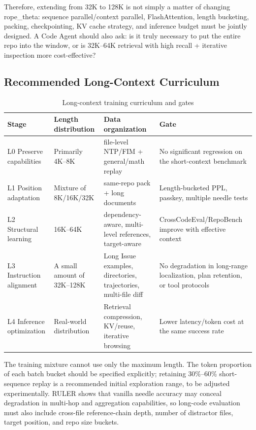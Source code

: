 \documentclass[10pt,a4paper,UTF8,fontset=none]{ctexart}
\newcommand{\ident}[1]{{\rmfamily #1}}
\begin{document}
Therefore, extending from 32K to 128K is not simply a matter of changing \ident{rope\_theta}: sequence parallel/context parallel, FlashAttention, length bucketing, packing, checkpointing, KV cache strategy, and inference budget must be jointly designed. A Code Agent should also ask: is it truly necessary to put the entire repo into the window, or is 32K--64K retrieval with high recall + iterative inspection more cost-effective?

\subsection{Recommended Long-Context Curriculum}

\begin{table}[htbp]
\centering
\caption{Long-context training curriculum and gates}
\label{tab:long-curriculum}
\small
\begin{tabularx}{\textwidth}{p{2.2cm}p{2.5cm}YY}
\toprule
Stage & Length distribution & Data organization & Gate \\
\midrule
L0 Preserve capabilities & Primarily 4K--8K & file-level NTP/FIM + general/math replay & No significant regression on the short-context benchmark \\
L1 Position adaptation & Mixture of 8K/16K/32K & same-repo pack + long documents & Length-bucketed PPL, passkey, multiple needle tests \\
L2 Structural learning & 16K--64K & dependency-aware, multi-level references, target-aware & CrossCodeEval/RepoBench improve with effective context \\
L3 Instruction alignment & A small amount of 32K--128K & Long Issue examples, directories, trajectories, multi-file diff & No degradation in long-range localization, plan retention, or tool protocols \\
L4 Inference optimization & Real-world distribution & Retrieval compression, KV/reuse, iterative browsing & Lower latency/token cost at the same success rate \\
\bottomrule
\end{tabularx}
\end{table}

The training mixture cannot use only the maximum length. The token proportion of each batch bucket should be specified explicitly; retaining 30\%--60\% short-sequence replay is a recommended initial exploration range, to be adjusted experimentally. RULER shows that vanilla needle accuracy may conceal degradation in multi-hop and aggregation capabilities\cite{hsieh2024ruler}, so long-code evaluation must also include cross-file reference-chain depth, number of distractor files, target position, and repo size buckets.
\end{document}
